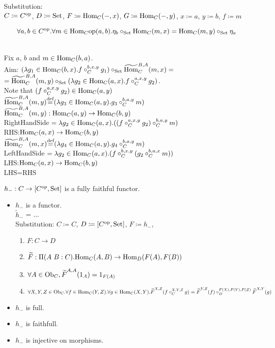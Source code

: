 \documentclass[10pt,a4paper]{article}
\begin{document}
Substitution:\\
$C \coloneqq C^{\textrm{op}}$, $D \coloneqq {\textrm{Set}}$, $F \coloneqq {\textrm{Hom}}_C(-,x)$, $G \coloneqq {\textrm{Hom}}_C(-,y)$, $x \coloneqq a$, $y \coloneqq b$, $f \coloneqq m$
\begin{lemma}
$$\forall a,b\in C^{\textrm{op}}. \forall m\in {\textrm{Hom}}_C{\textrm{op}} (a,b).\eta_b \circ_{\textrm{Set}} {\textrm{Hom}}_C(m,x)={\textrm{Hom}}_C(m,y)\circ_{\textrm{Set}}\eta_a$$
\end{lemma}
\myprf\\
Fix $a$, $b$ and $m\in{\textrm{Hom}}_C(b,a)$.\\
Aim: $(\lambda g_1 \in {\textrm{Hom}}_C(b,x). f\circ^{b,x,y}_C g_1)\circ_{\textrm{Set}} {\widetilde{{\textrm{Hom}}}\textrm{}}_C^{B,A}(m,x) = $\\
$={\widetilde{{\textrm{Hom}}}\textrm{}}_C^{B,A}(m,y) \circ_{\textrm{Set}} (\lambda g_2 \in {\textrm{Hom}}_C(a,x). f\circ^{a,x,y}_C g_2)$.\\
Note that $(f\circ^{a,x,y}_C g_2) \in {\textrm{Hom}}_C(a,y)$\\
${\widetilde{{\textrm{Hom}}}\textrm{}}_C^{B,A}(m,y) {\stackrel{{\textrm{def}}}{=}} (\lambda g_3 \in {\textrm{Hom}}_C(a,y). g_3\circ^{b,a,y}_C m)$\\
${\widetilde{{\textrm{Hom}}}\textrm{}}_C^{B,A}(m,y) : {\textrm{Hom}}_C(a,y) \to {\textrm{Hom}}_C(b,y)$\\
RightHandSide $= \lambda g_2 \in {\textrm{Hom}}_C(a,x). ((f \circ_C^{a,x,y} g_2) \circ_C^{b,a,y} m )$\\
RHS:${\textrm{Hom}}_C(a,x) \to {\textrm{Hom}}_C(b,y)$\\
${\widetilde{{\textrm{Hom}}}\textrm{}}_C^{B,A}(m,x) {\stackrel{{\textrm{def}}}{=}} (\lambda g_4 \in {\textrm{Hom}}_C(a,y). g_4\circ^{b,a,y}_C m)$\\
LeftHandSide $= \lambda g_2 \in {\textrm{Hom}}_C(a,x). (f \circ_C^{b,x,y} (g_2 \circ_C^{b,a,x} m ))$\\
LHS:${\textrm{Hom}}_C(a,x) \to {\textrm{Hom}}_C(b,y)$\\
LHS=RHS\\
\myqed
\begin{lemma}
$h_{-}:C\rightarrow [C^{op},{\textrm{Set}}]$ is a fully faithful functor.
\end{lemma}
\myprf
\begin{itemize}
\item $h_-$ is a functor.\\
$\widetilde{h}_-$ = ...\\
Substitution: $C\coloneqq C$, $D\coloneqq [C^{\textrm{op}},{\textrm{Set}}]$, $F\coloneqq h_-$,
\begin{enumerate}
\item $F:C \to D$
\item ${\widetilde{F}\textrm{}}:\Pi(A\ B:C).{\textrm{Hom}}_C(A,B) \to {\textrm{Hom}}_D(F(A), F(B))$
\item $\forall A\in {\textrm{Ob}}_C, {\widetilde{F}\textrm{}}^{A,A}(1_A)=1_{F(A)}$
\item $\forall X,Y,Z \in {\textrm{Ob}}_C.\forall f\in{\textrm{Hom}}_C(Y,Z).\forall g\in{\textrm{Hom}}_C(X,Y). {\widetilde{F}\textrm{}}^{X,Z}(f\circ_C^{X,Y,Z} g)={\widetilde{F}\textrm{}}^{Y,Z}(f)\circ_D^{F(X),F(Y),F(Z)} {\widetilde{F}\textrm{}}^{X,Y}(g)$
\end{enumerate}
\item $h_-$ is full.
\item $h_-$ is faithfull.
\item $h_-$ is injective on morphisms.
\end{itemize}
\end{document}

